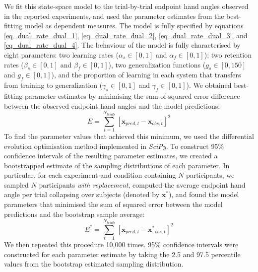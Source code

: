 \documentclass[jou, 11pt, longtable, floatsintext, notab]{apa6}
\begin{document}
We fit this state-space model to the trial-by-trial endpoint
hand angles observed in the reported experiments, and used
the parameter estimates from the best-fitting model as
dependent measures. The model is fully specified by
equations \ref{eq_dual_rate_dual_1},
\ref{eq_dual_rate_dual_2}, \ref{eq_dual_rate_dual_3}, and
\ref{eq_dual_rate_dual_4}. The behaviour of the model is
fully characterised by eight parameters: two learning rates
($\alpha_s \in [0, 1]$ and $\alpha_f \in [0,1]$); two
retention rates ($\beta_s \in [0,1]$ and $\beta_f \in
[0,1]$), two generalization functions ($g_s \in [0, 150]$
and $g_f \in [0, 1]$), and the proportion of learning in
each system that transfers from training to generalization
($\gamma_s \in [0,1]$ and $\gamma_f \in [0,1]$). We obtained
best-fitting parameter estimates by minimising the sum of
squared error difference between the observed endpoint hand
angles and the model predictions:
\begin{equation}
  E = \sum_{t=1}^{N_{trials}} \left[ \boldsymbol{x}_{pred, t} - \boldsymbol{x}_{obs, t} \right]^2
  \label{eq_sse}
\end{equation}
To find the parameter values that achieved this minimum, we
used the differential evolution optimisation method
implemented in \textit{SciPy}. To construct 95\% confidence
intervals of the resulting parameter estimates, we created a
bootstrapped estimate of the sampling distributions of each
parameter. In particular, for each experiment and condition
containing $N$ participants, we sampled $N$ participants
\textit{with replacement}, computed the average endpoint
hand angle per trial collapsing over subjects (denoted by
$\boldsymbol{x^{*}}$), and found the model parameters that
minimised the sum of squared error between the model
predictions and the bootstrap sample average:
\begin{equation}
    E^* = \sum_{t=1}^{N_{trials}} \left[ \boldsymbol{x}_{pred, t} - \boldsymbol{x^*}_{obs, t} \right]^2
  \label{eq_sse_boot}
\end{equation}
We then repeated this procedure 10,000 times. 95\%
confidence intervals were constructed for each parameter
estimate by taking the 2.5 and 97.5 percentile values from
the bootstrap estimated sampling distribution.
\end{document}
